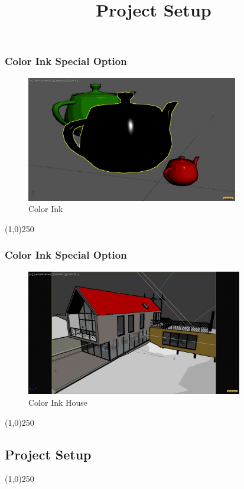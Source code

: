 \begin{frame}
\frametitle{Color Ink Special Option}
\begin{figure}
	\centering
	\includegraphics[height=5.5cm]{img/ViewportOptions/ColorInk.jpg}
	\caption{Color Ink}
	\label{fig:Ink}
\end{figure}
\end{frame}
\begin{center}\line(1,0){250}\end{center}


\begin{frame}
\frametitle{Color Ink Special Option}
\begin{figure}
	\centering
	\includegraphics[height=5.5cm]{img/ViewportOptions/ColorInkHouse.jpg}
	\caption{Color Ink House}
	\label{fig:ColorInkHouse}
\end{figure}
\end{frame}
\begin{center}\line(1,0){250}\end{center}




\subsection{Project Setup}
\begin{frame}
\title[Project Setup]{Project Setup}
\titlepage
\end{frame}\begin{center}\line(1,0){250}\end{center}



